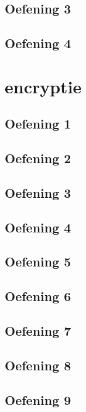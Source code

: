 \documentclass[a4paper,11pt]{report}
\begin{document}
\section{Oefening 3}

\section{Oefening 4}

\newpage

\chapter{encryptie}
\section{Oefening 1}

\section{Oefening 2}

\section{Oefening 3}

\section{Oefening 4}

\section{Oefening 5}

\section{Oefening 6}

\section{Oefening 7}

\section{Oefening 8}

\section{Oefening 9}

\end{document}
